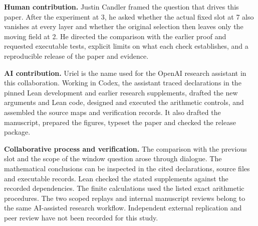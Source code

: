 \documentclass[12pt,letterpaper]{article}
\begin{document}
\textbf{Human contribution.} Justin Candler framed the question that drives this paper. After the experiment at 3, he asked whether the actual fixed slot at 7 also vanishes at every layer and whether the original selection then leaves only the moving field at 2. He directed the comparison with the earlier proof and requested executable tests, explicit limits on what each check establishes, and a reproducible release of the paper and evidence.

\medskip
\textbf{AI contribution.} Uriel is the name used for the OpenAI research assistant in this collaboration. Working in Codex, the assistant traced declarations in the pinned Lean development and earlier research supplements, drafted the new arguments and Lean code, designed and executed the arithmetic controls, and assembled the source maps and verification records. It also drafted the manuscript, prepared the figures, typeset the paper and checked the release package.

\medskip
\textbf{Collaborative process and verification.} The comparison with the previous slot and the scope of the window question arose through dialogue. The mathematical conclusions can be inspected in the cited declarations, source files and executable records. Lean checked the stated supplements against the recorded dependencies. The finite calculations used the listed exact arithmetic procedures. The two scoped replays and internal manuscript reviews belong to the same AI-assisted research workflow. Independent external replication and peer review have not been recorded for this study.
\end{document}

